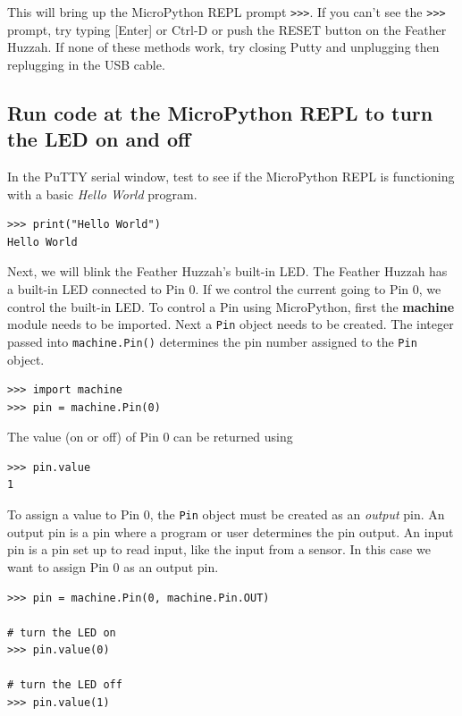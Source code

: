 \documentclass{book}
\begin{document}
This will bring up the MicroPython REPL prompt \lstinline!>>>!. If you
can't see the \lstinline!>>>! prompt, try typing {[}Enter{]} or Ctrl-D
or push the RESET button on the Feather Huzzah. If none of these methods
work, try closing Putty and unplugging then replugging in the USB cable.
    




    
        \subsection{Run code at the MicroPython REPL to turn the LED on and
off}\label{run-code-at-the-micropython-repl-to-turn-the-led-on-and-off}
    




    
        In the PuTTY serial window, test to see if the MicroPython REPL is
functioning with a basic \emph{Hello World} program.

\begin{lstlisting}
>>> print("Hello World")
Hello World
\end{lstlisting}

Next, we will blink the Feather Huzzah's built-in LED. The Feather
Huzzah has a built-in LED connected to Pin 0. If we control the current
going to Pin 0, we control the built-in LED. To control a Pin using
MicroPython, first the \textbf{machine} module needs to be imported.
Next a \lstinline!Pin! object needs to be created. The integer passed
into \lstinline!machine.Pin()! determines the pin number assigned to the
\lstinline!Pin! object.

\begin{lstlisting}
>>> import machine
>>> pin = machine.Pin(0)
\end{lstlisting}

The value (on or off) of Pin 0 can be returned using

\begin{lstlisting}
>>> pin.value
1
\end{lstlisting}

To assign a value to Pin 0, the \lstinline!Pin! object must be created
as an \emph{output} pin. An output pin is a pin where a program or user
determines the pin output. An input pin is a pin set up to read input,
like the input from a sensor. In this case we want to assign Pin 0 as an
output pin.

\begin{lstlisting}
>>> pin = machine.Pin(0, machine.Pin.OUT)

# turn the LED on
>>> pin.value(0)

# turn the LED off
>>> pin.value(1)
\end{lstlisting}
    
\end{document}
